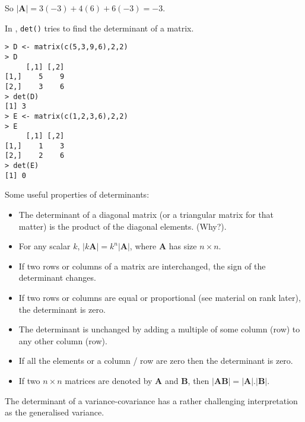 So $\lvert \boldsymbol{A}  \rvert = 3(-3) + 4(6) + 6(-3) = -3$.




In \R, \texttt{det()} tries to find the determinant of a matrix.

\singlespacing
\begin{verbatim}
> D <- matrix(c(5,3,9,6),2,2)
> D
     [,1] [,2]
[1,]    5    9
[2,]    3    6
> det(D)
[1] 3
> E <- matrix(c(1,2,3,6),2,2)
> E
     [,1] [,2]
[1,]    1    3
[2,]    2    6
> det(E)
[1] 0
\end{verbatim}
\onehalfspacing

Some useful properties of determinants:

\begin{itemize}
\item The determinant of a diagonal matrix (or a triangular matrix for that matter) is the product of the diagonal elements.   (Why?).   
\item For any scalar $k$, $|k\boldsymbol{A}| = k^{n}|\boldsymbol{A}|$, where $\boldsymbol{A}$ has size $n \times n$.   
\item If two rows or columns of a matrix are interchanged, the sign of the determinant changes.   
\item If two rows or columns are equal or proportional (see material on rank later), the determinant is zero.   
\item The determinant is unchanged by adding a multiple of some column (row) to any other column (row).   
\item If all the elements or a column / row are zero then the determinant is zero.   
\item If two $n \times n$ matrices are denoted by $\boldsymbol{A}$ and $\boldsymbol{B}$, then $|\boldsymbol{AB}| = |\boldsymbol{A}|.|\boldsymbol{B}|$.
\end{itemize}

The determinant of a variance-covariance has a rather challenging interpretation as the generalised variance.


